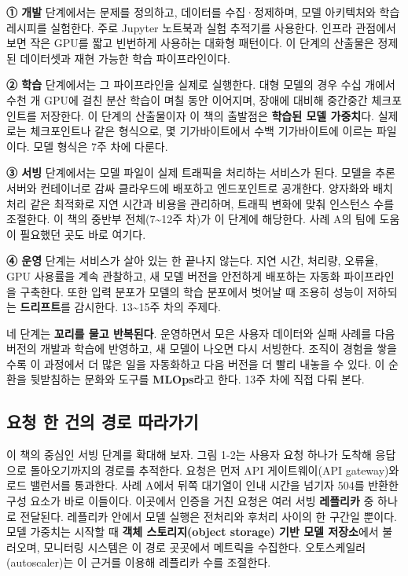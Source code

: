 \textbf{① 개발} 단계에서는 문제를 정의하고, 데이터를 수집·정제하며, 모델 아키텍처와 학습 레시피를 실험한다. 주로 Jupyter 노트북과 실험 추적기를 사용한다. 인프라 관점에서 보면 작은 GPU를 짧고 빈번하게 사용하는 대화형 패턴이다. 이 단계의 산출물은 정제된 데이터셋과 재현 가능한 학습 파이프라인이다.

\textbf{② 학습} 단계에서는 그 파이프라인을 실제로 실행한다. 대형 모델의 경우 수십 개에서 수천 개 GPU에 걸친 분산 학습이 며칠 동안 이어지며, 장애에 대비해 중간중간 체크포인트를 저장한다. 이 단계의 산출물이자 이 책의 출발점은 \textbf{학습된 모델 가중치}다. 실제로는 체크포인트나  같은 형식으로, 몇 기가바이트에서 수백 기가바이트에 이르는 파일이다. 모델 형식은 7주 차에 다룬다.

\textbf{③ 서빙} 단계에서는 모델 파일이 실제 트래픽을 처리하는 서비스가 된다. 모델을 추론 서버와 컨테이너로 감싸 클라우드에 배포하고 엔드포인트로 공개한다. 양자화와 배치 처리 같은 최적화로 지연 시간과 비용을 관리하며, 트래픽 변화에 맞춰 인스턴스 수를 조절한다. 이 책의 중반부 전체(7\textasciitilde{}12주 차)가 이 단계에 해당한다. 사례 A의 팀에 도움이 필요했던 곳도 바로 여기다.

\textbf{④ 운영} 단계는 서비스가 살아 있는 한 끝나지 않는다. 지연 시간, 처리량, 오류율, GPU 사용률을 계속 관찰하고, 새 모델 버전을 안전하게 배포하는 자동화 파이프라인을 구축한다. 또한 입력 분포가 모델의 학습 분포에서 벗어날 때 조용히 성능이 저하되는 \textbf{드리프트}를 감시한다. 13\textasciitilde{}15주 차의 주제다.

네 단계는 \textbf{꼬리를 물고 반복된다}. 운영하면서 모은 사용자 데이터와 실패 사례를 다음 버전의 개발과 학습에 반영하고, 새 모델이 나오면 다시 서빙한다. 조직이 경험을 쌓을수록 이 과정에서 더 많은 일을 자동화하고 다음 버전을 더 빨리 내놓을 수 있다. 이 순환을 뒷받침하는 문화와 도구를 \textbf{MLOps}라고 한다. 13주 차에 직접 다뤄 본다.

\subsection*{요청 한 건의 경로 따라가기}

이 책의 중심인 서빙 단계를 확대해 보자. 그림 1-2는 사용자 요청 하나가 도착해 응답으로 돌아오기까지의 경로를 추적한다. 요청은 먼저 API 게이트웨이(API gateway)와 로드 밸런서를 통과한다. 사례 A에서 뒤쪽 대기열이 인내 시간을 넘기자 504를 반환한 구성 요소가 바로 이들이다. 이곳에서 인증을 거친 요청은 여러 서빙 \textbf{레플리카} 중 하나로 전달된다. 레플리카 안에서 모델 실행은 전처리와 후처리 사이의 한 구간일 뿐이다. 모델 가중치는 시작할 때 \textbf{객체 스토리지(object storage) 기반 모델 저장소}에서 불러오며, 모니터링 시스템은 이 경로 곳곳에서 메트릭을 수집한다. 오토스케일러(autoscaler)는 이 근거를 이용해 레플리카 수를 조절한다.

